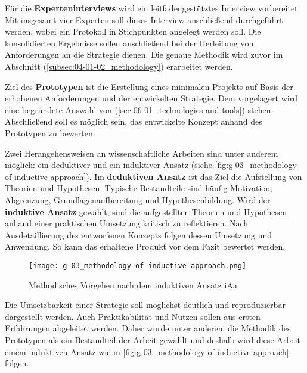 Für die \textbf{Experteninterviews} wird ein leitfadengestütztes Interview vorbereitet. Mit insgesamt vier Experten soll dieses Interview anschließend durchgeführt werden, wobei ein Protokoll in Stichpunkten angelegt werden soll. Die konsolidierten Ergebnisse sollen anschließend bei der Herleitung von Anforderungen an die  Strategie dienen. Die genaue Methodik wird zuvor im Abschnitt  (\autoref{subsec:04-01-02_methodology}) erarbeitet werden.

Ziel des \textbf{Prototypen} ist die Erstellung eines minimalen Projekts auf Basis der erhobenen Anforderungen und der entwickelten Strategie. Dem vorgelagert wird eine begründete Auswahl von  (\autoref{sec:06-01_technologies-and-tools}) stehen. Abschließend soll es möglich sein, das entwickelte Konzept anhand des Prototypen zu bewerten.

Zwei Herangehensweisen an wissenschaftliche Arbeiten sind unter anderem möglich: ein deduktiver und ein induktiver Ansatz (siehe \autoref{fig:g-03_methodology-of-inductive-approach}). Im \textbf{deduktiven Ansatz} ist das Ziel die Aufstellung von Theorien und Hypothesen. Typische Bestandteile sind häufig Motivation, Abgrenzung, Grundlagenaufbereitung und Hypothesenbildung. Wird der \textbf{induktive Ansatz} gewählt, sind die aufgestellten Theorien und Hypothesen anhand einer praktischen Umsetzung kritisch zu reflektieren. Nach Ausdetaillierung des entworfenen Konzepts folgen dessen Umsetzung und Anwendung. So kann das erhaltene Produkt vor dem Fazit bewertet werden. \cite{400:Beitrag-Produktrepraesentation-fuer-Bedarfs-und-Kapazitaetsmanagement-digitalisierter-Fahrzeuge}

\begin{figure}[h]
    \centering
    \texttt{[image: g-03\_methodology-of-inductive-approach.png]}
    \caption{Methodisches Vorgehen nach dem induktiven Ansatz \acrshort{iAa} \citeauthor{400:Beitrag-Produktrepraesentation-fuer-Bedarfs-und-Kapazitaetsmanagement-digitalisierter-Fahrzeuge}}
    \label{fig:g-03_methodology-of-inductive-approach}
\end{figure}

Die Umsetzbarkeit einer  Strategie soll möglichst deutlich und reproduzierbar dargestellt werden. Auch Praktikabilität und Nutzen sollen aus ersten Erfahrungen abgeleitet werden. Daher wurde unter anderem die Methodik des Prototypen als ein Bestandteil der Arbeit gewählt und deshalb wird diese Arbeit einem induktiven Ansatz wie in \autoref{fig:g-03_methodology-of-inductive-approach} folgen.

